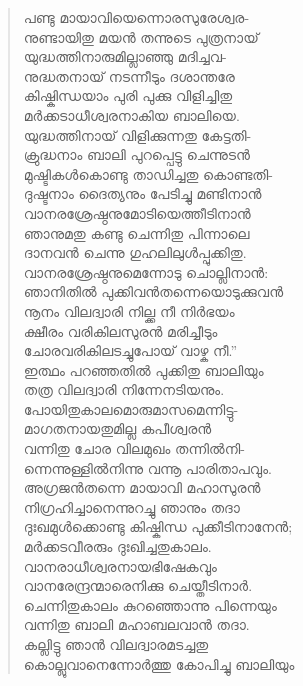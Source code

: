 \begin{verse}
പണ്ടു മായാവിയെന്നൊരസുരേശ്വര-\\
നുണ്ടായിതു മയന്‍ തന്നുടെ പുത്രനായ്\\
യുദ്ധത്തിനാരുമില്ലാഞ്ഞു മദിച്ചവ-\\
നുദ്ധതനായ് നടന്നീടും ദശാന്തരേ\\
കിഷ്കിന്ധയാം പുരി പുക്കു വിളിച്ചിതു\\
മര്‍ക്കടാധീശ്വരനാകിയ ബാലിയെ.\\
യുദ്ധത്തിനായ് വിളിക്കുന്നതു കേട്ടതി-\\
ക്രുദ്ധനാം ബാലി പുറപ്പെട്ടു ചെന്നുടന്‍\\
മുഷ്ടികള്‍കൊണ്ടു താഡിച്ചതു കൊണ്ടതി-\\
ദുഷ്ടനാം ദൈത്യനും പേടിച്ചു മണ്ടിനാന്‍\\
വാനരശ്രേഷ്ഠനുമോടിയെത്തീടിനാന്‍\\
ഞാനുമതു കണ്ടു ചെന്നിതു പിന്നാലെ\\
ദാനവന്‍ ചെന്നു ഗുഹലിലുള്‍പ്പുക്കിതു.\\
വാനരശ്രേഷ്ഠനുമെന്നോടു ചൊല്ലിനാന്‍:\\
ഞാനിതില്‍ പുക്കിവന്‍തന്നെയൊടുക്കുവന്‍\\
നൂനം വിലദ്വാരി നില്ക്ക നീ നിര്‍ഭയം\\
ക്ഷീരം വരികിലസുരന്‍ മരിച്ചീടും\\
ചോരവരികിലടച്ചുപോയ് വാഴ്ക നീ.”\\
ഇത്ഥം പറഞ്ഞതില്‍ പുക്കിതു ബാലിയും\\
തത്ര വിലദ്വാരി നിന്നേനടിയനും.\\
പോയിതുകാലമൊരുമാസമെന്നിട്ടു-\\
മാഗതനായതുമില്ല കപീശ്വരന്‍\\
വന്നിതു ചോര വിലമുഖം തന്നില്‍നി-\\
ന്നെന്നുള്ളില്‍നിന്നു വന്നൂ പാരിതാപവും.\\
അഗ്രജന്‍തന്നെ മായാവി മഹാസുരന്‍\\
നിഗ്രഹിച്ചാനെന്നുറച്ചു ഞാനും തദാ\\
ദുഃഖമുള്‍ക്കൊണ്ടു കിഷ്കിന്ധ പുക്കീടിനാനേന്‍;\\
മര്‍ക്കടവീരരും ദുഃഖിച്ചതുകാലം.\\
വാനരാധീശ്വരനായഭിഷേകവും\\
വാനരേന്ദ്രന്മാരെനിക്കു ചെയ്തീടിനാര്‍.\\
ചെന്നിതുകാലം കുറഞ്ഞൊന്നു പിന്നെയും\\
വന്നിതു ബാലി മഹാബലവാന്‍ തദാ.\\
കല്ലിട്ടു ഞാന്‍ വിലദ്വാരമടച്ചതു\\
കൊല്ലുവാനെന്നോര്‍ത്തു കോപിച്ചു ബാലിയും\\

\end{verse}
